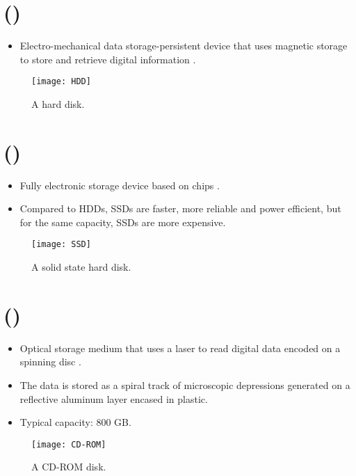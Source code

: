\section{ ()}
\begin{itemize}
\item Electro-mechanical data storage-persistent device that uses
  magnetic storage to store and retrieve digital information
  \cite{wikipedia_NDD}.
\end{itemize}
\begin{figure}[H]
  \vspace{-1ex}
  \centering
  \texttt{[image: HDD]}
  \caption{A hard disk.}
  \label{fig:HDD}
\end{figure}

\section{ ()}
\begin{itemize}
\item Fully electronic storage device based on  chips \cite{wikipedia_SSD}.
\item Compared to \gls{HDD}s, \gls{SSD}s are faster, more reliable and
  power efficient, but for the same capacity, \gls{SSD}s are more
  expensive.
\end{itemize}
\begin{figure}[H]
  \vspace{-1ex}
  \centering
  \texttt{[image: SSD]}
  \caption{A solid state hard disk.}
  \label{fig:SSD}
\end{figure}

\section{ ({)}}
\begin{itemize}
\item Optical storage medium that uses a laser to read digital data
  encoded on a spinning disc \cite{wikipedia_CD-ROM}.
\item The data is stored as a spiral track of microscopic depressions
  generated on a reflective aluminum layer encased in plastic.
\item Typical capacity: 800 GB.
\end{itemize}
\begin{figure}[H]
  \vspace{-4ex}
  \centering
  \texttt{[image: CD-ROM]}
  \caption{A \gls{CD-ROM} disk.}
  \label{fig:CD-ROM}
\end{figure}
  
